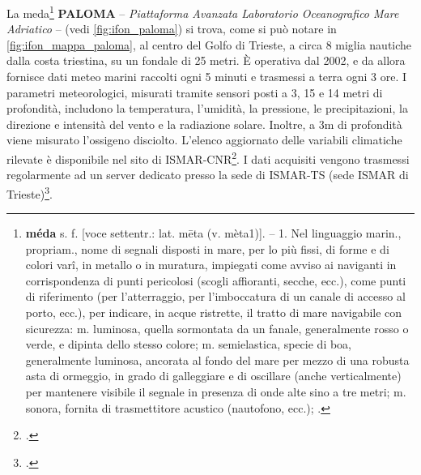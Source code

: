 \documentclass[./main.tex]{subfiles}
\begin{document}
La meda\footnote{\textbf{méda} s. f. [voce settentr.: lat. mēta (v. mèta1)]. – 1. Nel linguaggio marin., propriam., nome di segnali disposti in mare, per lo più fissi, di forme e di colori varî, in metallo o in muratura, impiegati come avviso ai naviganti in corrispondenza di punti pericolosi (scogli affioranti, secche, ecc.), come punti di riferimento (per l’atterraggio, per l’imboccatura di un canale di accesso al porto, ecc.), per indicare, in acque ristrette, il tratto di mare navigabile con sicurezza: m. luminosa, quella sormontata da un fanale, generalmente rosso o verde, e dipinta dello stesso colore; m. semielastica, specie di boa, generalmente luminosa, ancorata al fondo del mare per mezzo di una robusta asta di ormeggio, in grado di galleggiare e di oscillare (anche verticalmente) per mantenere visibile il segnale in presenza di onde alte sino a tre metri; m. sonora, fornita di trasmettitore acustico (nautofono, ecc.); \cite{treccani-meda}.} \textbf{PALOMA} -- \textit{Piattaforma Avanzata Laboratorio Oceanografico Mare Adriatico} -- (vedi \autoref{fig:ifon_paloma}) si trova, come si può notare in \autoref{fig:ifon_mappa_paloma}, al centro del Golfo di Trieste, a circa 8 miglia nautiche dalla costa triestina, su un fondale di 25 metri. È operativa dal 2002, e da allora fornisce dati meteo marini raccolti ogni 5 minuti e trasmessi a terra ogni 3 ore. I parametri meteorologici, misurati tramite sensori posti a 3, 15 e 14 metri di profondità, includono la temperatura, l’umidità, la pressione, le precipitazioni, la direzione e intensità del vento e la radiazione solare. Inoltre, a 3m di profondità viene misurato l'ossigeno disciolto. L'elenco aggiornato delle variabili climatiche rilevate è disponibile nel sito di ISMAR-CNR\footcite[\url{https://www.ismar.cnr.it/infrastrutture/infrastrutture-oceanografiche/paloma/}]{website-ismar-cnr}. I dati acquisiti vengono trasmessi regolarmente ad un server dedicato presso la sede di ISMAR-TS (sede ISMAR di Trieste)\footcite[11-12]{rete-ifon}.\par
\end{document}
